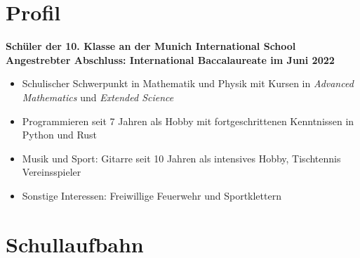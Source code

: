 \documentclass[12pt]{article}
\newcommand{\sect}[1]{
  {
    \vspace{12pt}
    \section*{
      \fontsize{18}{0}\selectfont
      \hspace{-12pt}
      \vspace{-12pt}
      #1
    }
    \vspace{-6pt}
  }
}
\begin{document}
\sect{Profil}

\textbf{Sch{\"u}ler der 10. Klasse an der Munich International School \\
  Angestrebter Abschluss: International Baccalaureate im Juni 2022}

\begin{itemize}[leftmargin=*]
  \itemsep0pt

\item Schulischer Schwerpunkt in Mathematik und Physik mit Kursen in \textit{\glqq
  Advanced Mathematics\grqq} und \textit{\glqq Extended Science\grqq}

\item Programmieren seit 7 Jahren als Hobby mit fortgeschrittenen Kenntnissen in
  Python und Rust

\item Musik und Sport: Gitarre seit 10 Jahren als intensives Hobby,
  Tischtennis Vereinsspieler

\item Sonstige Interessen: Freiwillige Feuerwehr und Sportklettern

\end{itemize}
\vspace{-24pt}

\sect{Schullaufbahn}
\vspace{6pt}
\end{document}

